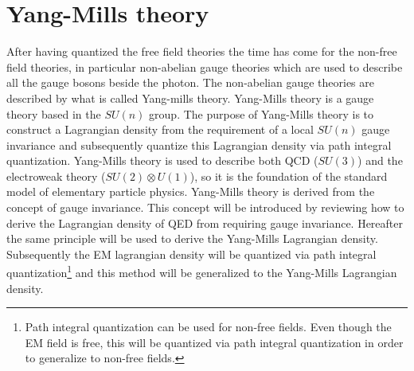 \section{Yang-Mills theory}
After having quantized the free field theories the time has come for the non-free field theories, in particular non-abelian gauge theories which are used to describe all the gauge bosons beside the photon. The non-abelian gauge theories are described by what is called Yang-mills theory. Yang-Mills theory is a gauge theory based in the $SU(n)$ group. The purpose of Yang-Mills theory is to construct a Lagrangian density from the requirement of a local $SU(n)$ gauge invariance and subsequently quantize this Lagrangian density via path integral quantization. Yang-Mills theory is used to describe both QCD ($SU(3)$) and the electroweak theory ($SU(2)\otimes U(1)$), so it is the foundation of the standard model of elementary particle physics. Yang-Mills theory is derived from the concept of gauge invariance. This concept will be introduced by reviewing how to derive the Lagrangian density of QED from requiring gauge invariance. Hereafter the same principle will be used to derive the Yang-Mills Lagrangian density. Subsequently the EM lagrangian density will be quantized via path integral quantization\footnote{Path integral quantization can be used for non-free fields. Even though the EM field is free, this will be quantized via path integral quantization in order to generalize to non-free fields.} and this method will be generalized to the Yang-Mills Lagrangian density.

